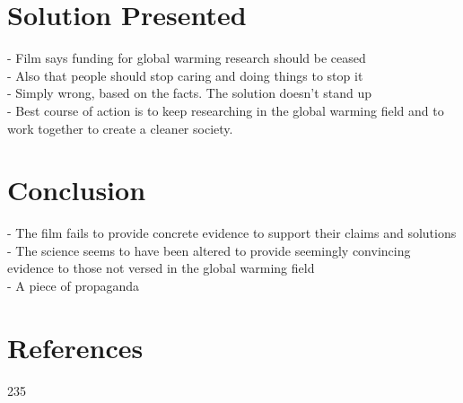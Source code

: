 \documentclass[12pt]{article}
\begin{document}
\section{Solution Presented}
	- Film says funding for global warming research should be ceased\\
	- Also that people should stop caring and doing things to stop it\\
	- Simply wrong, based on the facts. The solution doesn't stand up\\
	- Best course of action is to keep researching in the global warming field and to work together to create a cleaner society.\\
\section{Conclusion}
	- The film fails to provide concrete evidence to support their claims and solutions\\
	- The science seems to have been altered to provide seemingly convincing evidence to those not versed in the global warming field \\
	- A piece of propaganda \\
\section{References}
235
\end{document}
